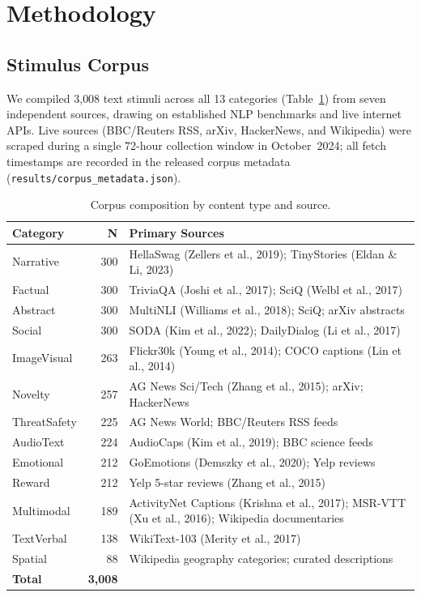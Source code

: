 \documentclass[11pt,letterpaper]{article}
\begin{document}
\FloatBarrier
\clearpage
\section{Methodology}

\subsection{Stimulus Corpus}

We compiled 3{,}008 text stimuli across all 13 categories (Table~\ref{tab:corpus}) from seven independent sources, drawing on established NLP benchmarks and live internet APIs. Live sources (BBC/Reuters RSS, arXiv, HackerNews, and Wikipedia) were scraped during a single 72-hour collection window in October~2024; all fetch timestamps are recorded in the released corpus metadata (\texttt{results/\allowbreak corpus\_metadata.json}).

\begin{table}[ht]
\centering
\small
\caption{Corpus composition by content type and source.}
\label{tab:corpus}
\begin{tabular}{l r p{8cm}}
\toprule
\textbf{Category} & \textbf{N} & \textbf{Primary Sources} \\
\midrule
Narrative      & 300 & HellaSwag (Zellers et al., 2019); TinyStories (Eldan \& Li, 2023) \\
Factual        & 300 & TriviaQA (Joshi et al., 2017); SciQ (Welbl et al., 2017) \\
Abstract       & 300 & MultiNLI (Williams et al., 2018); SciQ; arXiv abstracts \\
Social         & 300 & SODA (Kim et al., 2022); DailyDialog (Li et al., 2017) \\
ImageVisual    & 263 & Flickr30k (Young et al., 2014); COCO captions (Lin et al., 2014) \\
Novelty        & 257 & AG News Sci/Tech (Zhang et al., 2015); arXiv; HackerNews \\
ThreatSafety   & 225 & AG News World; BBC/Reuters RSS feeds \\
AudioText      & 224 & AudioCaps (Kim et al., 2019); BBC science feeds \\
Emotional      & 212 & GoEmotions (Demszky et al., 2020); Yelp reviews \\
Reward         & 212 & Yelp 5-star reviews (Zhang et al., 2015) \\
Multimodal     & 189 & ActivityNet Captions (Krishna et al., 2017); MSR-VTT (Xu et al., 2016); Wikipedia documentaries \\
TextVerbal     & 138 & WikiText-103 (Merity et al., 2017) \\
Spatial        &  88 & Wikipedia geography categories; curated descriptions \\
\midrule
\textbf{Total} & \textbf{3{,}008} & \\
\bottomrule
\end{tabular}
\end{table}
\end{document}
